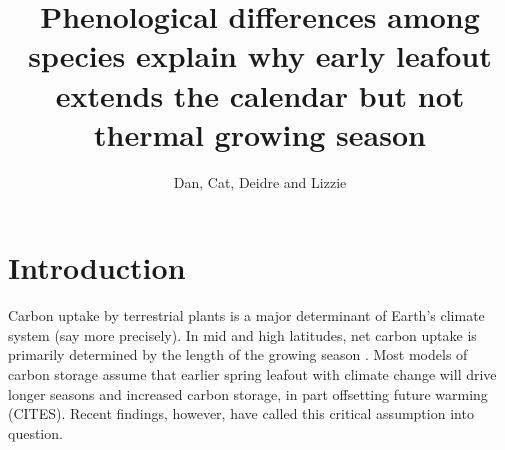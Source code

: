 \documentclass[12 pt]{article}
\title{Phenological differences among species explain why early leafout extends the calendar but not thermal growing season}
\author{Dan, Cat, Deidre and Lizzie}
\begin{document}
\maketitle
\setlength{\parindent}{0pt}


\section{Introduction}
Carbon uptake by terrestrial plants is a major determinant of Earth's climate system \citep{} (say more precisely). In mid and high latitudes, net carbon uptake is primarily determined by the length of the growing season \citep{}. Most models of carbon storage assume that earlier spring leafout with climate change will drive longer seasons and increased carbon storage, in part offsetting future warming (CITES). Recent findings, however, have called this critical assumption into question. 
\end{document}
